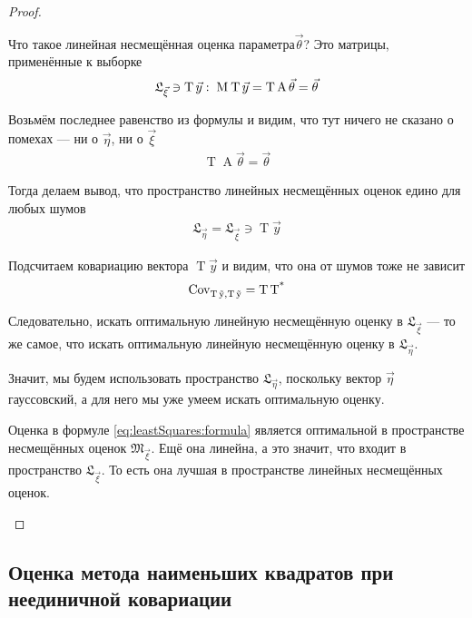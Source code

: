 \begin{proof}
\begin{enumerate}
      Что такое линейная несмещённая оценка параметра$\vec{\theta}$?
      Это матрицы, применённые к выборке
      \begin{align*}
          \mathfrak{L}_{\vec{\xi}} \ni \operatorname{T} \vec{y}:\;
          \operatorname{M}_{} \operatorname{T} \vec{y}
          = \operatorname{T} \operatorname{A} \vec{\theta}
          = \vec{\theta}
      \end{align*}

      Возьмём последнее равенство из формулы и видим, что тут ничего не
      сказано о помехах --- ни о $\vec{\eta}$, ни о $\vec{\xi}$
      \begin{align*}
          \operatorname{T} \operatorname{A} \vec{\theta}
          = \vec{\theta}
      \end{align*}

      Тогда делаем вывод, что пространство линейных несмещённых оценок
      едино для любых шумов
      \begin{align*}
          \mathfrak{L}_{\vec{\eta}}
          = \mathfrak{L}_{\vec{\xi}}
          \ni \operatorname{T} \vec{y}
      \end{align*}

      Подсчитаем ковариацию вектора $\operatorname{T} \vec{y}$ и видим,
      что она от шумов тоже не зависит
      \begin{align*}
          \operatorname{Cov^{}_{\operatorname{T} \vec{y}, \operatorname{T} \vec{y}}}
          = \operatorname{T} \operatorname{T^*}
      \end{align*}

      Следовательно, искать оптимальную линейную несмещённую оценку в
      $\mathfrak{L}_{\vec{\xi}}$ --- то же самое, что искать оптимальную
      линейную несмещённую оценку в $\mathfrak{L}_{\vec{\eta}}$.

      Значит, мы будем использовать пространство
      $\mathfrak{L}_{\vec{\eta}}$, поскольку вектор $\vec{\eta}$
      гауссовский, а для него мы уже умеем искать оптимальную оценку.

      Оценка в формуле \eqref{eq:leastSquares:formula} является
      оптимальной в пространстве несмещённых оценок
      $\mathfrak{M}_{\vec{\xi}}$. Ещё она линейна, а это значит, что
      входит в пространство $\mathfrak{L}_{\vec{\xi}}$.
      То есть она лучшая в пространстве линейных несмещённых оценок.
  \end{enumerate}
\end{proof}
\subsection{Оценка метода наименьших квадратов при неединичной ковариации}


